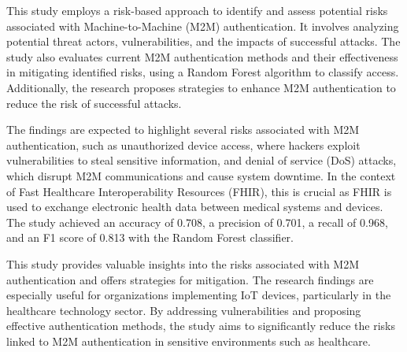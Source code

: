 This study employs a risk-based approach to identify and assess potential risks associated with Machine-to-Machine (M2M) authentication. It involves analyzing potential threat actors, vulnerabilities, and the impacts of successful attacks. The study also evaluates current M2M authentication methods and their effectiveness in mitigating identified risks, using a Random Forest algorithm to classify access. Additionally, the research proposes strategies to enhance M2M authentication to reduce the risk of successful attacks.

The findings are expected to highlight several risks associated with M2M authentication, such as unauthorized device access, where hackers exploit vulnerabilities to steal sensitive information, and denial of service (DoS) attacks, which disrupt M2M communications and cause system downtime. In the context of Fast Healthcare Interoperability Resources (FHIR), this is crucial as FHIR is used to exchange electronic health data between medical systems and devices. The study achieved an accuracy of 0.708, a precision of 0.701, a recall of 0.968, and an F1 score of 0.813 with the Random Forest classifier.

This study provides valuable insights into the risks associated with M2M authentication and offers strategies for mitigation. The research findings are especially useful for organizations implementing IoT devices, particularly in the healthcare technology sector. By addressing vulnerabilities and proposing effective authentication methods, the study aims to significantly reduce the risks linked to M2M authentication in sensitive environments such as healthcare.